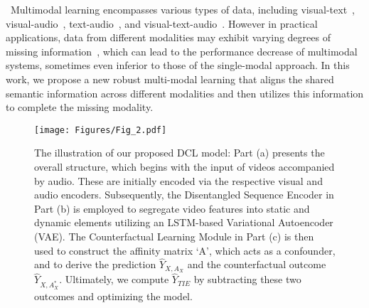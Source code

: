 ~Multimodal learning encompasses various types of data, including visual-text~\cite{lu2019vilbert}, visual-audio~\cite{hu2021class}, text-audio~\cite{deshmukh2023pengi}, and visual-text-audio~\cite{li2022learning}. However in practical applications, data from different modalities may exhibit varying degrees of missing information~\cite{wang2023multi}, which can lead to the performance decrease of multimodal systems, sometimes even inferior to those of the single-modal approach. In this work, we propose a new robust multi-modal learning that aligns the shared semantic information across different modalities and then utilizes this information to complete the missing modality.


\begin{figure*}[!t]
    \centering
    \texttt{[image: Figures/Fig\_2.pdf]}
    \vspace{-4mm}
    \caption{The illustration of our proposed DCL model: Part (a) presents the overall structure, which begins with the input of videos accompanied by audio. These are initially encoded via the respective visual and audio encoders. Subsequently, the Disentangled Sequence Encoder in Part (b) is employed to segregate video features into static and dynamic elements utilizing an LSTM-based Variational Autoencoder (VAE). The Counterfactual Learning Module in Part (c) is then used to construct the affinity matrix `A', which acts as a confounder, and to derive the prediction $\hat{Y}_{X, A_X}$ and the counterfactual outcome $\hat{Y}_{X, A^*_X}$. Ultimately, we compute $\hat{Y}_{TIE}$ by subtracting these two outcomes and optimizing the model.}
    \label{fig: an overview of model}
    \vspace{-3mm}
\end{figure*}